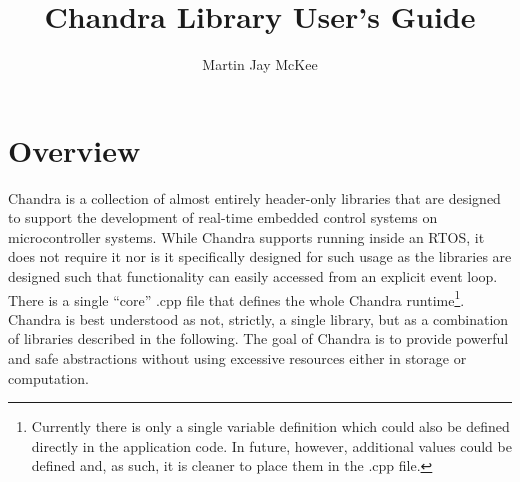 \documentclass[10pt,letterpaper]{memoir} %
\title{Chandra Library User's Guide}
\author{Martin Jay McKee}
\begin{document}

\maketitle
\tableofcontents* %

\chapter{Overview}
Chandra is a collection of almost entirely header-only libraries that are designed to support the development of real-time embedded control systems on microcontroller systems.  While Chandra supports running inside an RTOS, it does not require it nor is it specifically designed for such usage as the libraries are designed such that functionality can easily accessed from an explicit event loop.  There is a single ``core'' .cpp file that defines the whole Chandra runtime\footnote{Currently there is only a single variable definition which could also be defined directly in the application code.  In future, however, additional values could be defined and, as such, it is cleaner to place them in the .cpp file.}.  Chandra is best understood as not, strictly, a single library, but as a combination of libraries described in the following.  The goal of Chandra is to provide powerful and safe abstractions without using excessive resources either in storage or computation. 
\end{document}
